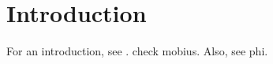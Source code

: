 \documentclass[elemannt.tex]{subfile}
\begin{document}
    \chapter{Introduction}
    For an introduction, see \textcite{apostol_1976}. check \gls{mobius}. Also, see \acrlong{phi}.
\end{document}
